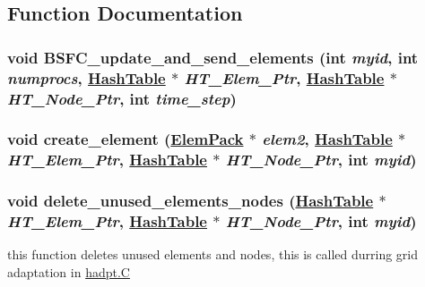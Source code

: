 \subsection{Function Documentation}
\hypertarget{BSFC__update__and__send__elements_8C_a1}{
\subsubsection[BSFC\_\-update\_\-and\_\-send\_\-elements]{\setlength{\rightskip}{0pt plus 5cm}void BSFC\_\-update\_\-and\_\-send\_\-elements (int {\em myid}, int {\em numprocs}, \hyperlink{classHashTable}{Hash\-Table} $\ast$ {\em HT\_\-Elem\_\-Ptr}, \hyperlink{classHashTable}{Hash\-Table} $\ast$ {\em HT\_\-Node\_\-Ptr}, int {\em time\_\-step})}}
\label{BSFC__update__and__send__elements_8C_a1}


\hypertarget{BSFC__update__and__send__elements_8C_a0}{
\subsubsection[create\_\-element]{\setlength{\rightskip}{0pt plus 5cm}void create\_\-element (\hyperlink{structElemPack}{Elem\-Pack} $\ast$ {\em elem2}, \hyperlink{classHashTable}{Hash\-Table} $\ast$ {\em HT\_\-Elem\_\-Ptr}, \hyperlink{classHashTable}{Hash\-Table} $\ast$ {\em HT\_\-Node\_\-Ptr}, int {\em myid})}}
\label{BSFC__update__and__send__elements_8C_a0}


\hypertarget{BSFC__update__and__send__elements_8C_a2}{
\subsubsection[delete\_\-unused\_\-elements\_\-nodes]{\setlength{\rightskip}{0pt plus 5cm}void delete\_\-unused\_\-elements\_\-nodes (\hyperlink{classHashTable}{Hash\-Table} $\ast$ {\em HT\_\-Elem\_\-Ptr}, \hyperlink{classHashTable}{Hash\-Table} $\ast$ {\em HT\_\-Node\_\-Ptr}, int {\em myid})}}
\label{BSFC__update__and__send__elements_8C_a2}


this function deletes unused elements and nodes, this is called durring grid adaptation in \hyperlink{constant_8h_a21}{hadpt.C} 

